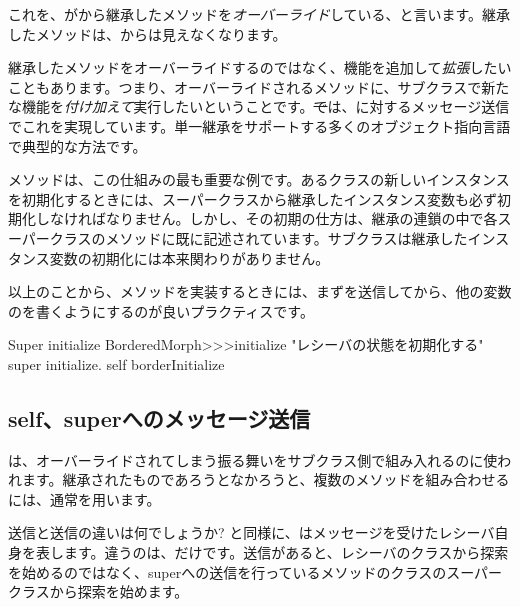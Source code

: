 \documentclass[a4paper,10pt,twoside]{book}
\begin{document}
これを、がから継承したメソッドを\emph{オーバーライド}している、と言います。継承したメソッドは、からは見えなくなります。

継承したメソッドをオーバーライドするのではなく、機能を追加して\emph{拡張}したいこともあります。つまり、オーバーライドされるメソッドに、サブクラスで新たな機能を\emph{付け加えて}実行したいということです。\st では、\super に対するメッセージ送信でこれを実現しています。単一継承をサポートする多くのオブジェクト指向言語で典型的な方法です。

メソッドは、この仕組みの最も重要な例です。あるクラスの新しいインスタンスを初期化するときには、スーパークラスから継承したインスタンス変数も必ず初期化しなければなりません。しかし、その初期の仕方は、継承の連鎖の中で各スーパークラスのメソッドに既に記述されています。サブクラスは継承したインスタンス変数の初期化には本来関わりがありません。

以上のことから、メソッドを実装するときには、まずを送信してから、他の変数のを書くようにするのが良いプラクティスです。


\begin{method}[morphinit]{Super initialize}
BorderedMorph>>>initialize
	"レシーバの状態を初期化する"
	super initialize.
	self borderInitialize
\end{method}


\subsection{self、superへのメッセージ送信}

\super{}は、オーバーライドされてしまう振る舞いをサブクラス側で組み入れるのに使われます。継承されたものであろうとなかろうと、複数のメソッドを組み合わせるには、通常\self{}を用います。

\self 送信と\super 送信の違いは何でしょうか? \self と同様に、\super はメッセージを受けたレシーバ自身を表します。違うのは、だけです。\super 送信があると、レシーバのクラスから探索を始めるのではなく、superへの送信を行っているメソッドのクラスのスーパークラスから探索を始めます。
\end{document}
